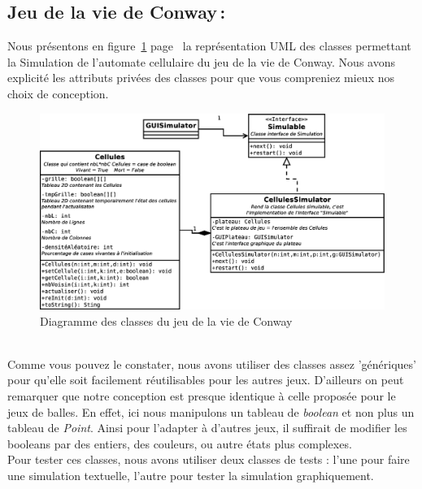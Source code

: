 \documentclass[a4paper, 10pt, french]{article}
\begin{document}
	\subsection{Jeu de la vie de Conway\,: }
		{
Nous présentons en figure~\ref{étiquette} page~\pageref{étiquette} la représentation UML des classes permettant la Simulation de l'automate cellulaire du jeu de la vie de Conway. Nous avons explicité les attributs privées des classes pour que vous compreniez mieux nos choix de conception.
\begin{figure}[h]
	\includegraphics[scale=0.4]{UML_Cellules.eps}
	\caption{\label{étiquette} Diagramme des classes du jeu de la vie de Conway}
\end{figure}
\\ \indent Comme vous pouvez le constater, nous avons utiliser des classes assez 'génériques' pour qu'elle soit facilement réutilisables pour les autres jeux. D'ailleurs on peut remarquer que notre conception est presque identique à celle proposée pour le jeux de balles. En effet, ici nous manipulons un tableau de {\em boolean} et non plus un tableau de {\em Point}. Ainsi pour l'adapter à d'autres jeux, il suffirait de modifier les booleans par des entiers, des couleurs, ou autre états plus complexes.
\\ \indent Pour tester ces classes, nous avons utiliser deux classes de tests : l'une pour faire une simulation textuelle, l'autre pour tester la simulation graphiquement.
		} 
\end{document}
